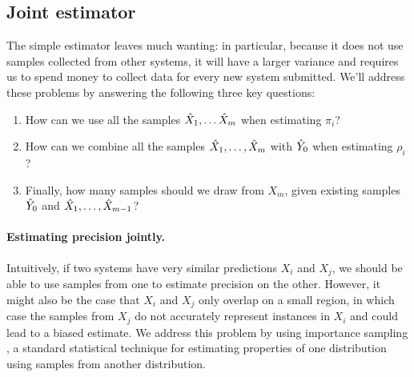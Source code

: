 \subsection{Joint estimator}
The simple estimator leaves much wanting: in particular, because it does not use samples collected from other systems, it will have a larger variance and requires us to spend money to collect data for every new system submitted.
We'll address these problems by answering the following three key questions:
\begin{enumerate}
  \item How can we use all the samples ${\hat{X}}_1, \ldots {\hat{X}}_m$ when estimating $\pi_i$?
  \item How can we combine all the samples ${\hat{X}}_1, \ldots, {\hat{X}}_m$ with ${\hat{Y}}_0$ when estimating $\rho_i$?
  \item Finally, how many samples should we draw from $X_m$, given existing samples ${\hat{Y}}_0$ and ${\hat{X}}_1, \ldots, {\hat{X}}_{m-1}$?
\end{enumerate}
%
%
%

\paragraph{Estimating precision jointly.}
Intuitively, if two systems have very similar predictions $X_i$ and $X_j$, we should be able to use samples from one to estimate precision on the other.
However, it might also be the case that $X_i$ and $X_j$ only overlap on a small region, in which case the samples from $X_j$ do not accurately represent instances in $X_i$ and could lead to a biased estimate.
We address this problem by using importance sampling \citep{owen2013monte}, a standard statistical technique for estimating properties of one distribution using samples from another distribution.

